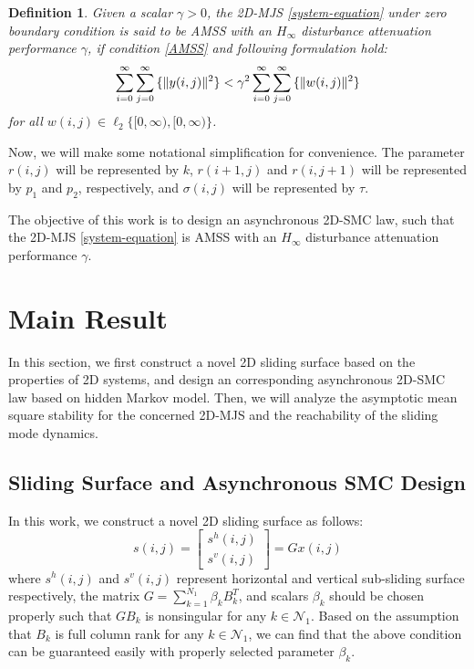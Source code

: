 \documentclass[journal,final,twocolumn]{IEEEtran}
\newtheorem{definition}{Definition}
\begin{document}
	\begin{definition}\label{H_infty-performance}
		Given a scalar $\gamma>0$, the 2D-MJS \eqref{system-equation} under zero boundary condition is said to be AMSS with an $H_{\infty}$ disturbance attenuation performance $\gamma$, if condition \eqref{AMSS} and following formulation hold:
		\begin{equation} \label{invDef2}
			\sum_{i=0}^{\infty}\sum_{j=0}^{\infty}\mathbb\{\|y(i,j)\|^{2}\} <  \gamma^{2} \sum_{i=0}^{\infty}\sum_{j=0}^{\infty}\mathbb\{\|w(i,j)\|^{2}\}
		\end{equation}
		for all $w(i,j)\in\ell_{2}\{[0,\infty),[0,\infty)\}$.
	\end{definition}
	
	Now, we will make some notational simplification for convenience. The parameter $r(i,j)$ will be represented by $k$, $r(i+1,j)$ and $r(i,j+1)$ will be represented by $p_1$ and $p_2$, respectively, and $\sigma(i,j)$ will be represented by $\tau$. 
	
	
	
	 The objective of this work is to design an asynchronous  2D-SMC law, such that the 2D-MJS \eqref{system-equation} is AMSS with an $H_{\infty}$ disturbance attenuation performance $\gamma$. 

\section{Main Result}
In this section, we first construct a novel 2D sliding surface based on the properties of 2D systems, and design an  corresponding  asynchronous 2D-SMC law based on hidden Markov model.  Then, we will analyze the asymptotic mean square stability for the concerned 2D-MJS and the reachability of the sliding mode dynamics.

\subsection{ Sliding Surface and Asynchronous SMC Design} \label{sliding-surface}
	In this work, we construct a novel 2D sliding surface as follows: 
	\begin{equation}\label{siding-surface-equation}	
		s(i,j) = \begin{bmatrix}
					s^{h}(i,j)\\
					s^{v}(i,j)
					\end{bmatrix}
			   = Gx(i,j)
	\end{equation}
	where $s^{h}(i,j)$ and $s^{v}(i,j)$ represent horizontal and vertical sub-sliding surface respectively, the matrix $G=\sum_{k=1}^{N_{1}}\beta_{k}B^{T}_{k}$, and scalars $\beta_{k}$ should be chosen properly such that $GB_{k}$ is nonsingular for any $k\in\mathcal{N}_{1}$. Based on the assumption that $B_{k}$ is full column rank for any $k\in\mathcal{N}_{1}$, we can find that the above condition can be guaranteed easily with properly selected parameter $\beta_{k}$. 
 	
\end{document}
